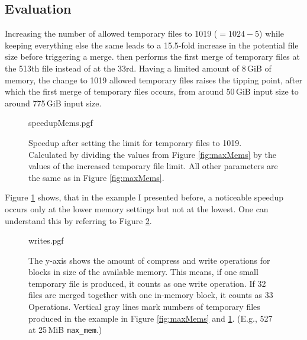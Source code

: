 \subsection{Evaluation}
Increasing the number of allowed temporary files to 1019 ($=1024-5$) while keeping everything else the same leads to a 15.5-fold increase in the potential file size before triggering a merge. \sort then performs the first merge of temporary files at the 513th file instead of at the 33rd. Having a limited amount of 8\,GiB of memory, the change to 1019 allowed temporary files raises the tipping point, after which the first merge of temporary files occurs, from around 50\,GiB input size to around 775\,GiB input size.
\begin{figure}
        {speedupMems.pgf}
    \caption{Speedup after setting the limit for temporary files to 1019. Calculated by dividing the values from Figure \ref{fig:maxMems} by the values of the increased temporary file limit. All other parameters are the same as in Figure \ref{fig:maxMems}.}
    \label{fig:memSpeedup}
\end{figure}
Figure \ref{fig:memSpeedup} shows, that in the example I presented before, a noticeable speedup occurs only at the lower memory settings but not at the lowest. One can understand this by referring to Figure \ref{fig:writes}.
\begin{figure}
        {writes.pgf}
    \caption{
    The y-axis shows the amount of compress and write operations for blocks in size of the available memory. This means, if one small temporary file is produced, it counts as one write operation. If 32 files are merged together with one in-memory block, it counts as 33 Operations. Vertical gray lines mark numbers of temporary files produced in the example in Figure \ref{fig:maxMems} and \ref{fig:memSpeedup}. (E.g., 527 at 25\,MiB \texttt{max\_mem}.)
    }
    \label{fig:writes}
\end{figure}
